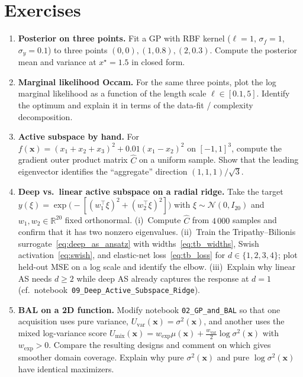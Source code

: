 \documentclass[11pt,a4paper]{report}
\newcommand{\x}{\bm{x}}
\newcommand{\R}{\mathbb{R}}
\begin{document}
\section*{Exercises}
\begin{enumerate}[itemsep=4pt, leftmargin=*]
\item\label{ex:ch9:1} \textbf{Posterior on three points.}  Fit a GP with RBF kernel ($\ell=1$, $\sigma_f=1$, $\sigma_y=0.1$) to three points $(0,0), (1,0.8), (2,0.3)$.  Compute the posterior mean and variance at $x^\star = 1.5$ in closed form.
\item\label{ex:ch9:2} \textbf{Marginal likelihood Occam.}  For the same three points, plot the log marginal likelihood as a function of the length scale $\ell \in [0.1, 5]$.  Identify the optimum and explain it in terms of the data-fit / complexity decomposition.
\item\label{ex:ch9:3} \textbf{Active subspace by hand.}  For $f(\x) = (x_1 + x_2 + x_3)^2 + 0.01(x_1 - x_2)^2$ on $[-1,1]^3$, compute the gradient outer product matrix $\hat C$ on a uniform sample.  Show that the leading eigenvector identifies the ``aggregate'' direction $(1,1,1)/\sqrt 3$.
\item\label{ex:ch9:4} \textbf{Deep vs.\ linear active subspace on a radial ridge.}  Take the target $y(\xi) = \exp\!\bigl(-[(w_1^\top\xi)^2 + (w_2^\top\xi)^2]\bigr)$ with $\xi \sim \mathcal{N}(0, I_{20})$ and $w_1, w_2 \in \R^{20}$ fixed orthonormal.  (i)~Compute $\hat C$ from $4\,000$ samples and confirm that it has two nonzero eigenvalues.  (ii)~Train the Tripathy--Bilionis surrogate~\eqref{eq:deep_as_ansatz} with widths~\eqref{eq:tb_widths}, Swish activation~\eqref{eq:swish}, and elastic-net loss~\eqref{eq:tb_loss} for $d \in \{1,2,3,4\}$; plot held-out MSE on a log scale and identify the elbow.  (iii)~Explain why linear AS needs $d \ge 2$ while deep AS already captures the response at $d = 1$ (cf.~notebook~\texttt{09\_Deep\_Active\_Subspace\_Ridge}).
\item\label{ex:ch9:5} \textbf{BAL on a 2D function.}  Modify notebook \texttt{02\_GP\_and\_BAL} so that one acquisition uses pure variance, $U_{\mathrm{var}}(\x)=\sigma^2(\x)$, and another uses the mixed log-variance score $U_{\mathrm{mix}}(\x)=w_{\mathrm{exp}}\mu(\x)+\tfrac{w_{\mathrm{var}}}{2}\log\sigma^2(\x)$ with $w_{\mathrm{exp}}>0$.  Compare the resulting designs and comment on which gives smoother domain coverage.  Explain why pure $\sigma^2(\x)$ and pure $\log\sigma^2(\x)$ have identical maximizers.

\end{enumerate}
\end{document}

